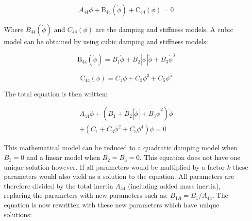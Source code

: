             
    
    \begin{equation}
A_{44} \ddot{\phi} + \operatorname{B_{44}}\left(\dot{\phi}\right) + \operatorname{C_{44}}\left(\phi\right) = 0
\label{eq:equation}
\end{equation}

    

    Where $B_{44}(\dot{\phi})$ and $C_{44}(\phi)$ are the damping and
stiffness models. A cubic model can be obtained by using cubic damping
and stiffness models:
 
            
    
    \begin{equation}
\operatorname{B_{44}}\left(\dot{\phi}\right) = B_{1} \dot{\phi} + B_{2} \left|{\dot{\phi}}\right| \dot{\phi} + B_{3} \dot{\phi}^{3}
\label{eq:equation}
\end{equation}

    
 
            
    
    \begin{equation}
\operatorname{C_{44}}\left(\phi\right) = C_{1} \phi + C_{3} \phi^{3} + C_{5} \phi^{5}
\label{eq:equation}
\end{equation}

    

    The total equation is then written:
 
            
    
    \begin{equation}
\begin{aligned}
A_{44} \ddot{\phi} + \left(B_{1} + B_{2} \left|{\dot{\phi}}\right| + B_{3} \dot{\phi}^{2}\right) \dot{\phi} \\ + \left(C_{1} + C_{3} \phi^{2} + C_{5} \phi^{4}\right) \phi = 0
\end{aligned}
\label{eq:equation}
\end{equation}

    

    This mathematical model can be reduced to a quadratic damping model when
$B_3=0$ and a linear model when $B_2=B_3=0$. This equation does not
have one unique solution however. If all parameters would be multiplied
by a factor $k$ these parameters would also yield as a solution to the
equation. All parameters are therefore divided by the total inertia
$A_{44}$ (including added mass inertia), replacing the parameters with
new parameters such as: $B_{1A} = B_1/A_{44}$. The equation is now
rewritten with these new parameters which have unique solutions:
 
